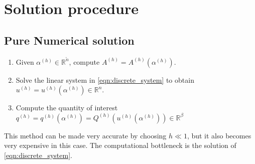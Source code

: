 \documentclass[11pt]{article}
\begin{document}
\section{Solution procedure}
\subsection{Pure Numerical solution}
\begin{enumerate}
\item Given $\alpha^{(h)}\in\mathbb{R}^{\widetilde{n}}$, compute $A^{(h)}=A^{(h)}(\alpha^{(h)})$.
\item Solve the linear system in \eqref{eqn:discrete_system} to obtain $u^{(h)}=u^{(h)}(\alpha^{(h)})\in\mathbb{R}^n$.
\item Compute the quantity of interest $q^{(h)} = q^{(h)}(\alpha^{(h)})= Q^{(h)}(u^{(h)}(\alpha^{(h)}))\in\mathbb{R}^\beta$
\end{enumerate}
This method can be made very accurate by choosing $h\ll1$, but it also becomes very expensive in this case. The computational bottleneck is the solution of  \eqref{eqn:discrete_system}.
\end{document}
